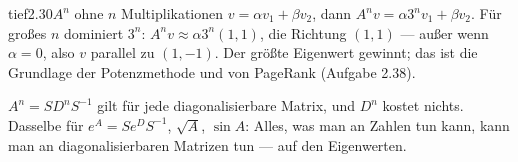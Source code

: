 \begin{loesungkarte}{tief}{2.30}{$A^{n}$ ohne $n$ Multiplikationen}
$v = \alpha v_1 + \beta v_2$, dann $A^{n}v = \alpha3^{n}v_1 + \beta v_2$. Für großes $n$ dominiert $3^{n}$: $A^{n}v\approx\alpha3^{n}(1, 1)$, die Richtung $(1, 1)$ --- außer wenn $\alpha = 0$, also $v$ parallel zu $(1, -1)$. Der größte Eigenwert gewinnt; das ist die Grundlage der Potenzmethode und von PageRank (Aufgabe 2.38).
\begin{mitnehmen}\kastentext
$A^{n} = SD^{n}S^{-1}$ gilt für jede diagonalisierbare Matrix, und $D^{n}$ kostet nichts. Dasselbe für $e^{A} = Se^{D}S^{-1}$, $\sqrt A$, $\sin A$: Alles, was man an Zahlen tun kann, kann man an diagonalisierbaren Matrizen tun --- auf den Eigenwerten.
\end{mitnehmen}
\end{loesungkarte}

